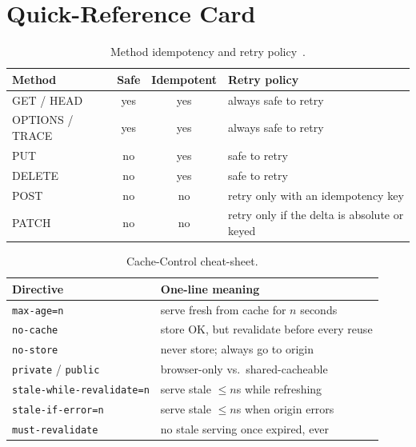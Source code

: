 \section{Quick-Reference Card}
\label{sec:ch10-quickref}

\begin{table}[h]
  \centering
  \small
  \begin{tabular}{l c c l}
    \toprule
    \textbf{Method} & \textbf{Safe} & \textbf{Idempotent} & \textbf{Retry policy} \\
    \midrule
    GET / HEAD & yes & yes & always safe to retry \\
    OPTIONS / TRACE & yes & yes & always safe to retry \\
    PUT & no & yes & safe to retry \\
    DELETE & no & yes & safe to retry \\
    POST & no & no & retry only with an idempotency key \\
    PATCH & no & no & retry only if the delta is absolute or keyed \\
    \bottomrule
  \end{tabular}
  \caption{Method idempotency and retry policy~\cite{rfc9110}.}
\end{table}

\begin{table}[h]
  \centering
  \small
  \begin{tabular}{l l}
    \toprule
    \textbf{Directive} & \textbf{One-line meaning} \\
    \midrule
    \texttt{max-age=n} & serve fresh from cache for $n$ seconds \\
    \texttt{no-cache} & store OK, but revalidate before every reuse \\
    \texttt{no-store} & never store; always go to origin \\
    \texttt{private} / \texttt{public} & browser-only vs.\ shared-cacheable \\
    \texttt{stale-while-revalidate=n} & serve stale $\le n$s while refreshing \\
    \texttt{stale-if-error=n} & serve stale $\le n$s when origin errors \\
    \texttt{must-revalidate} & no stale serving once expired, ever \\
    \bottomrule
  \end{tabular}
  \caption{Cache-Control cheat-sheet.}
\end{table}

